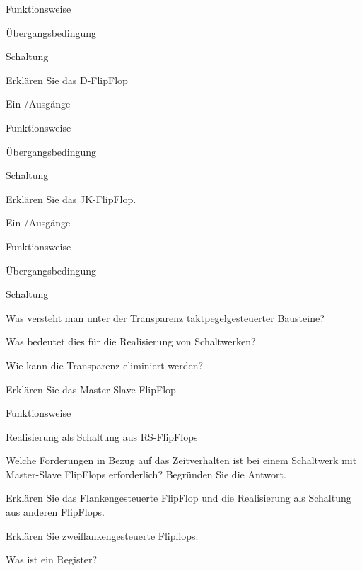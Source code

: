 \documentclass
[
  draft    = true,
  fontsize = 11pt,
  parskip  = half-,
  BCOR     = 0pt,
  DIV      = 11,
  ngerman,
  dvipsnames
]
{scrartcl}
\begin{document}
\begin{mytemize}
\begin{mytemize}
          \item Funktionsweise
          \item Übergangsbedingung
          \item Schaltung
        \end{mytemize}
  \item Erklären Sie das D-FlipFlop
        \begin{mytemize}
          \item Ein-/Ausgänge
          \item Funktionsweise
          \item Übergangsbedingung
          \item Schaltung
        \end{mytemize}
  \item Erklären Sie das JK-FlipFlop.
        \begin{mytemize}
          \item Ein-/Ausgänge
          \item Funktionsweise
          \item Übergangsbedingung
          \item Schaltung
        \end{mytemize}
  \item Was versteht man unter der Transparenz taktpegelgesteuerter Bausteine?
        \begin{mytemize}
          \item Was bedeutet dies für die Realisierung von Schaltwerken?
          \item Wie kann die Transparenz eliminiert werden?
        \end{mytemize}
  \item Erklären Sie das Master-Slave FlipFlop
        \begin{mytemize}
          \item Funktionsweise
          \item Realisierung als Schaltung aus RS-FlipFlops
        \end{mytemize}
  \item Welche Forderungen in Bezug auf das Zeitverhalten ist bei einem Schaltwerk mit Master-Slave FlipFlops erforderlich? Begründen Sie die Antwort.
  \item Erklären Sie das Flankengesteuerte FlipFlop und die Realisierung als Schaltung aus anderen FlipFlops.
  \item Erklären Sie zweiflankengesteuerte Flipflops.
  \item Was ist ein Register?

\end{mytemize}
\end{document}
